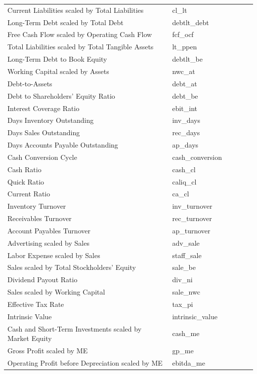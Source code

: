\documentclass[12pt,title,fleqn]{article}
\begin{document}
\begin{longtable}{p{5cm}p{2cm}p{5cm}lll}
Current Liabilities scaled by Total Liabilities & cl\_lt & & & & \\
Long-Term Debt scaled by Total Debt & debtlt\_debt & & & & \\
Free Cash Flow scaled by Operating Cash Flow & fcf\_ocf & & & & \\
Total Liabilities scaled by Total Tangible Assets & lt\_ppen & & & & \\
Long-Term Debt to Book Equity & debtlt\_be & & & & \\
Working Capital scaled by Assets & nwc\_at & & & & \\
Debt-to-Assets & debt\_at & & & & \\
Debt to Shareholders' Equity Ratio & debt\_be & & & & \\
Interest Coverage Ratio & ebit\_int & & & & \\
Days Inventory Outstanding & inv\_days & & & & \\
Days Sales Outstanding & rec\_days & & & & \\
Days Accounts Payable Outstanding & ap\_days & & & & \\
Cash Conversion Cycle & cash\_conversion & & & & \\
Cash Ratio & cash\_cl & & & & \\
Quick Ratio & caliq\_cl & & & & \\
Current Ratio & ca\_cl & & & & \\
Inventory Turnover & inv\_turnover & & & & \\
Receivables Turnover & rec\_turnover & & & & \\
Account Payables Turnover & ap\_turnover & & & & \\
Advertising scaled by Sales & adv\_sale & & & & \\
Labor Expense scaled by Sales & staff\_sale & & & & \\
Sales scaled by Total Stockholders' Equity & sale\_be & & & & \\
Dividend Payout Ratio & div\_ni & & & & \\
Sales scaled by Working Capital & sale\_nwc & & & & \\
Effective Tax Rate & tax\_pi & & & & \\
Intrinsic Value & intrinsic\_value & & & & \\
Cash and Short-Term Investments scaled by Market Equity & cash\_me & & & & \\
Gross Profit scaled by ME & gp\_me & & & & \\
Operating Profit before Depreciation scaled by ME & ebitda\_me & & & & \\

\end{longtable}
\end{document}
